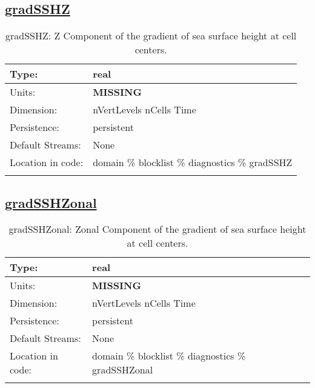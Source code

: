 \subsection[gradSSHZ]{\hyperref[sec:var_tab_diagnostics]{gradSSHZ}}
\label{subsec:var_sec_diagnostics_gradSSHZ}
\begin{center}
\begin{longtable}{| p{2.0in} | p{4.0in} |}
        \hline 
        Type: & real \\
        \hline 
        Units: & {\bf \color{red} MISSING} \\
        \hline 
        Dimension: & nVertLevels nCells Time \\
        \hline 
        Persistence: & persistent \\
        \hline 
		 Default Streams: & None \\
        \hline 
		 Location in code: & domain \% blocklist \% diagnostics \% gradSSHZ \\
		 \hline 
    \caption{gradSSHZ: Z Component of the gradient of sea surface height at cell centers.}
\end{longtable}
\end{center}
\subsection[gradSSHZonal]{\hyperref[sec:var_tab_diagnostics]{gradSSHZonal}}
\label{subsec:var_sec_diagnostics_gradSSHZonal}
\begin{center}
\begin{longtable}{| p{2.0in} | p{4.0in} |}
        \hline 
        Type: & real \\
        \hline 
        Units: & {\bf \color{red} MISSING} \\
        \hline 
        Dimension: & nVertLevels nCells Time \\
        \hline 
        Persistence: & persistent \\
        \hline 
		 Default Streams: & None \\
        \hline 
		 Location in code: & domain \% blocklist \% diagnostics \% gradSSHZonal \\
		 \hline 
    \caption{gradSSHZonal: Zonal Component of the gradient of sea surface height at cell centers.}
\end{longtable}
\end{center}
